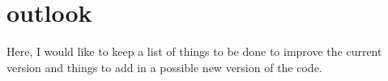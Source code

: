 \documentclass[aps,prl,groupedaddress]{revtex4}
\begin{document}
\section{outlook}
Here, I would like to keep a list of things to be done to improve the current version and things to add in a possible new version of the code.




%



%
\end{document}
